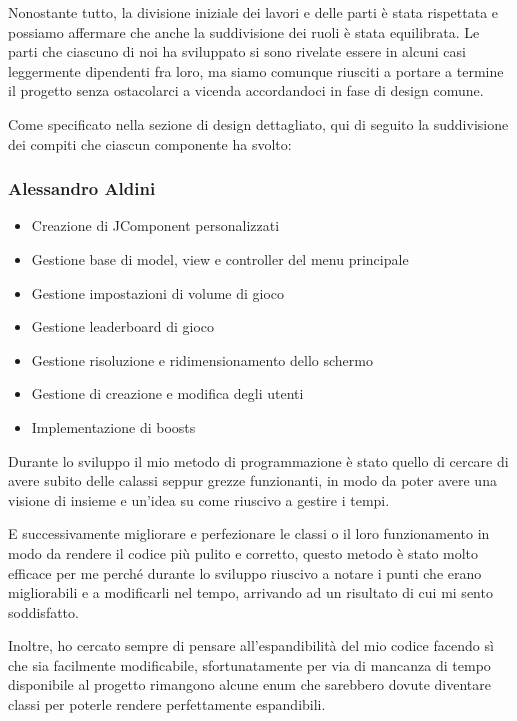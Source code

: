 \documentclass[a4paper,12pt]{report}
\begin{document}
    Nonostante tutto, la divisione iniziale dei lavori e delle parti è stata rispettata e possiamo affermare che anche la suddivisione dei ruoli è stata equilibrata. Le parti che
    ciascuno di noi ha sviluppato si sono rivelate essere in alcuni casi leggermente dipendenti fra loro, ma siamo comunque riusciti a portare a termine il progetto senza ostacolarci a vicenda accordandoci in fase di design comune.

    Come specificato nella sezione di design dettagliato, qui di seguito la
    suddivisione dei compiti che ciascun componente ha svolto:

    \subsubsection{Alessandro Aldini}

    \begin{itemize}
        \item Creazione di JComponent personalizzati
        \item Gestione base di model, view e controller del menu principale
        \item Gestione impostazioni di volume di gioco
        \item Gestione leaderboard di gioco
        \item Gestione risoluzione e ridimensionamento dello schermo
        \item Gestione di creazione e modifica degli utenti
        \item Implementazione di boosts
    \end{itemize}

    Durante lo sviluppo il mio metodo di programmazione è stato quello di cercare di avere subito delle calassi seppur grezze funzionanti, in modo da poter avere una visione di insieme e un’idea su come riuscivo a gestire i tempi.

    E successivamente migliorare e perfezionare le classi o il loro funzionamento in modo da rendere il codice più pulito e corretto, questo metodo è stato molto efficace per me perché durante lo sviluppo riuscivo a notare i punti che erano migliorabili e a modificarli nel tempo, arrivando ad un risultato di cui mi sento soddisfatto.

    Inoltre, ho cercato sempre di pensare all’espandibilità del mio codice facendo sì che sia facilmente modificabile, sfortunatamente per via di mancanza di tempo disponibile al progetto rimangono alcune enum che sarebbero dovute diventare classi per poterle rendere perfettamente espandibili.
\end{document}
